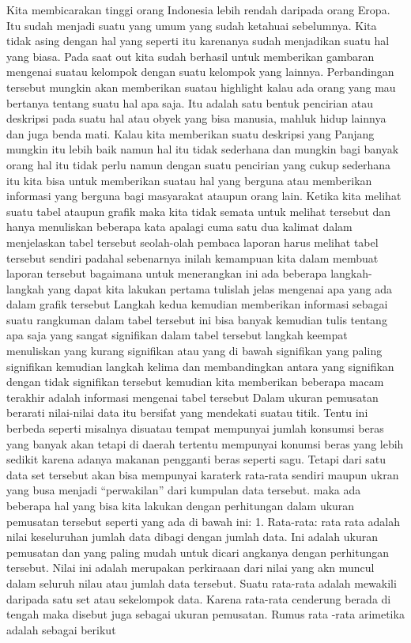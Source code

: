 \documentclass[
]{book}
\theoremstyle{definition}
\theoremstyle{definition}
\theoremstyle{definition}
\theoremstyle{definition}
\theoremstyle{remark}
\begin{document}
Kita membicarakan tinggi orang Indonesia lebih rendah daripada orang Eropa. Itu sudah menjadi suatu yang umum yang sudah ketahuai sebelumnya. Kita tidak asing dengan hal yang seperti itu karenanya sudah menjadikan suatu hal yang biasa. Pada saat out kita sudah berhasil untuk memberikan gambaran mengenai suatau kelompok dengan suatu kelompok yang lainnya.
Perbandingan tersebut mungkin akan memberikan suatau highlight kalau ada orang yang mau bertanya tentang suatu hal apa saja. Itu adalah satu bentuk pencirian atau deskripsi pada suatu hal atau obyek yang bisa manusia, mahluk hidup lainnya dan juga benda mati. Kalau kita memberikan suatu deskripsi yang Panjang mungkin itu lebih baik namun hal itu tidak sederhana dan mungkin bagi banyak orang hal itu tidak perlu namun dengan suatu pencirian yang cukup sederhana itu kita bisa untuk memberikan suatau hal yang berguna atau memberikan informasi yang berguna bagi masyarakat ataupun orang lain.
Ketika kita melihat suatu tabel ataupun grafik maka kita tidak semata untuk melihat tersebut dan hanya menuliskan beberapa kata apalagi cuma satu dua kalimat dalam menjelaskan tabel tersebut seolah-olah pembaca laporan harus melihat tabel tersebut sendiri padahal sebenarnya inilah kemampuan kita dalam membuat laporan tersebut bagaimana untuk menerangkan ini ada beberapa langkah-langkah yang dapat kita lakukan pertama tulislah jelas mengenai apa yang ada dalam grafik tersebut Langkah kedua kemudian memberikan informasi sebagai suatu rangkuman dalam tabel tersebut ini bisa banyak kemudian tulis tentang apa saja yang sangat signifikan dalam tabel tersebut langkah keempat menuliskan yang kurang signifikan atau yang di bawah signifikan yang paling signifikan kemudian langkah kelima dan membandingkan antara yang signifikan dengan tidak signifikan tersebut kemudian kita memberikan beberapa macam terakhir adalah informasi mengenai tabel tersebut
Dalam ukuran pemusatan berarati nilai-nilai data itu bersifat yang mendekati suatau titik. Tentu ini berbeda seperti misalnya disuatau tempat mempunyai jumlah konsumsi beras yang banyak akan tetapi di daerah tertentu mempunyai konumsi beras yang lebih sedikit karena adanya makanan pengganti beras seperti sagu. Tetapi dari satu data set tersebut akan bisa mempunyai karaterk rata-rata sendiri maupun ukran yang busa menjadi ``perwakilan'' dari kumpulan data tersebut. maka ada beberapa hal yang bisa kita lakukan dengan perhitungan dalam ukuran pemusatan tersebut seperti yang ada di bawah ini:
1. Rata-rata: rata rata adalah nilai keseluruhan jumlah data dibagi dengan jumlah data. Ini adalah ukuran pemusatan dan yang paling mudah untuk dicari angkanya dengan perhitungan tersebut. Nilai ini adalah merupakan perkiraaan dari nilai yang akn muncul dalam seluruh nilau atau jumlah data tersebut. Suatu rata-rata adalah mewakili daripada satu set atau sekelompok data. Karena rata-rata cenderung berada di tengah maka disebut juga sebagai ukuran pemusatan.
Rumus rata -rata arimetika adalah sebagai berikut
\end{document}
